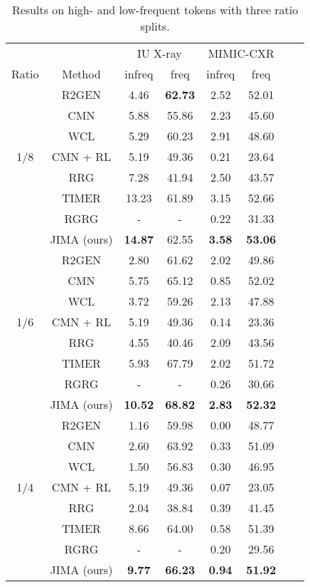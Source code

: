 \documentclass[sn-mathphys-num]{sn-jnl}%
\theoremstyle{thmstyleone}%
\theoremstyle{thmstyletwo}%
\theoremstyle{thmstylethree}%
\begin{document}
\begin{table*}[htp]
\centering
\caption{Results on high- and low-frequent tokens with three ratio splits. }
\label{tab:im}
    \begin{tabular}{cccccccc}
    && \multicolumn{2}{c}{IU X-ray} & \multicolumn{2}{c}{MIMIC-CXR} \\
     Ratio & Method & infreq & freq & infreq  & freq  \\\hline\hline
    \multirow{7}{*}{1/8} &R2GEN &4.46 &\textbf{62.73} &2.52 &52.01 \\
    &CMN  & 5.88 & 55.86 & 2.23 & 45.60 \\
    &WCL	&5.29	&60.23 & 2.91	&48.60 \\
    &CMN + RL	&5.19	&49.36 & 0.21	&23.64\\
    &RRG  &7.28 &41.94  &2.50 &43.57\\
     &TIMER &13.23 & 61.89 & 3.15 & 52.66\\
     &RGRG &- &-  &0.22 &31.33\\
    &JIMA (ours) &\textbf{14.87} &62.55 &\textbf{3.58} &\textbf{53.06}	 \\\hline
    \multirow{7}{*}{1/6}&R2GEN &2.80 &61.62 &2.02 &49.86\\
    &CMN  &5.75 & 65.12	&0.85 & 52.02 \\
    &WCL	&3.72	&59.26 &2.13	&47.88  \\
    &CMN + RL	&5.19	&49.36 & 0.14 &23.36\\
    &RRG  &4.55  &40.46 &2.09 &43.56 \\
    &TIMER  &5.93 & 67.79 &2.02 &51.72\\
     &RGRG &- &- &0.26 &30.66\\
    &JIMA (ours) &\textbf{10.52} &\textbf{68.82} &\textbf{2.83} &\textbf{52.32}\\\hline
    \multirow{7}{*}{1/4} &R2GEN &1.16 &59.98  &0.00  &48.77\\
    &CMN  &2.60 & 63.92 &0.33 &51.09 \\
    &WCL	&1.50	&56.83 &0.30	&46.95 \\
    &CMN + RL	&5.19	&49.36 & 0.07	&23.05\\
    &RRG  &2.04 &38.84 &0.39  &41.45 \\
     &TIMER & 8.66 & 64.00 & 0.58 & 51.39  \\
      &RGRG &- &-  &0.20 &29.56\\
    &JIMA (ours) &\textbf{9.77} &\textbf{66.23} &\textbf{0.94} &\textbf{51.92}\\
    \end{tabular}
\end{table*}
\end{document}
